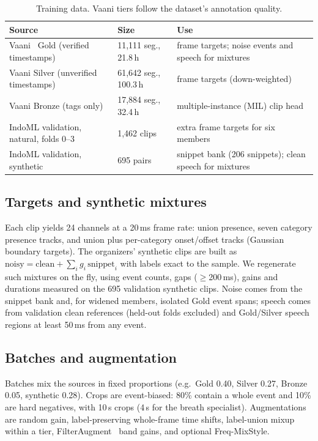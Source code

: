 \documentclass[conference]{IEEEtran}
\begin{document}
\begin{table}[b]
\centering
\caption{Training data. Vaani tiers follow the dataset's annotation quality.}
\label{tab:data}
\footnotesize
\setlength{\tabcolsep}{3pt}
\begin{tabular}{L{2.5cm}L{2.0cm}L{3.1cm}}
\toprule
Source & Size & Use\\
\midrule
Vaani~\cite{vaani} Gold (verified timestamps) & 11,111 seg., 21.8\,h & frame targets; noise events and speech for
mixtures\\
Vaani Silver (unverified timestamps) & 61,642 seg., 100.3\,h & frame targets (down-weighted)\\
Vaani Bronze (tags only) & 17,884 seg., 32.4\,h & multiple-instance (MIL) clip head\\
IndoML validation, natural, folds 0--3 & 1,462 clips & extra frame targets for six members\\
IndoML validation, synthetic & 695 pairs & snippet bank (206 snippets); clean speech for mixtures\\
\bottomrule
\end{tabular}
\end{table}

\subsection{Targets and synthetic mixtures}
Each clip yields 24 channels at a 20\,ms frame rate: union presence, seven category presence tracks, and union plus
per-category onset/offset tracks (Gaussian boundary targets). The organizers' synthetic clips are built as
$\text{noisy}=\text{clean}+\sum_i g_i\,\text{snippet}_i$ with labels exact to the sample. We regenerate such
mixtures on the fly, using event counts, gaps ($\geq$200\,ms), gains and durations measured on the 695 validation
synthetic clips. Noise comes from the snippet bank and, for widened members, isolated Gold event spans; speech comes
from validation clean references (held-out folds excluded) and Gold/Silver speech regions at least 50\,ms from any
event.

\subsection{Batches and augmentation}
Batches mix the sources in fixed proportions (e.g.\ Gold 0.40, Silver 0.27, Bronze 0.05, synthetic 0.28). Crops are
event-biased: 80\% contain a whole event and 10\% are hard negatives, with 10\,s crops (4\,s for the breath
specialist). Augmentations are random gain, label-preserving whole-frame time shifts, label-union mixup within a
tier, FilterAugment~\cite{filteraug} band gains, and optional Freq-MixStyle.
\end{document}
